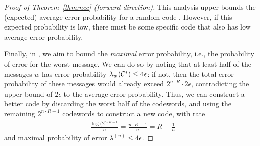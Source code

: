 \begin{proof}[Proof of Theorem~\ref{thm:ncc} (forward direction)]
This analysis upper bounds the (expected) average error probability for a random code \cran. However, if this expected probability is low, there must be some specific code \cspec that also has low average error probability.

Finally, in \cspec, we aim to bound the \emph{maximal} error probability, i.e., the probability of error for the worst message. We can do so by noting that at least half of the messages $w$ has error probability $\lambda_w(\mathcal{C}^*) \leq 4 \epsilon$: if not, then the total error probability of these messages would already exceed $2^{n \cdot R} \cdot 2\epsilon$, contradicting the upper bound of $2 \epsilon$ to the average error probability. Thus, we can construct a better code by discarding the worst half of the codewords, and using the remaining $2^{n \cdot R - 1}$ codewords to construct a new code, with rate
\begin{align}
\frac{\log(2^{n\cdot R - 1}}{n} = \frac{n \cdot R - 1}{n} = R - \frac{1}{n}
\end{align}
and maximal probability of error $\lambda^{(n)} \leq 4 \epsilon$.
\end{proof}



